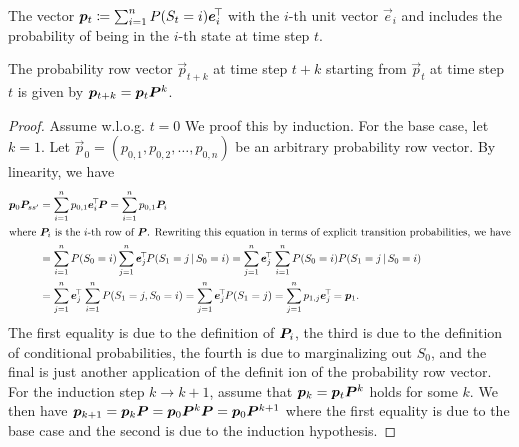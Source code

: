 		\begin{definition}  \label{def:probRowVector}
			The vector \( \bm{p}_t \coloneqq \sum_{i = 1}^{n} P(S_t = i) \bm{e}_i^{\!\top\!} \) with the \(i\)-th unit vector \(\vec{e}_i\) and includes the probability of being in the \(i\)-th state at time step \(t\).
		\end{definition}

		\begin{theorem}
			The probability row vector \( \vec{p}_{t + k} \) at time step \(t + k\) starting from \(\vec{p}_t\) at time step \(t\) is given by \( \bm{p}_{t + k} = \bm{p}_t \bm{P}^k \).
		\end{theorem}
		\begin{proof}
			Assume w.l.o.g. \( t = 0 \) We proof this by induction. For the base case, let \(k = 1\). Let \( \vec{p}_0 = (p_{0, 1}, p_{0, 2}, \dots, p_{0, n}) \) be an arbitrary probability row vector. By linearity, we have
			\begin{align}
				\vec{p}_0 \mat{P}_{ss'}
				 & = \sum_{i = 1}^{n} p_{0, 1} \vec{e}_i^\transposed \mat{P}
				= \sum_{i = 1}^{n} p_{0, 1} \mat{P}_i                                                             \\
				\intertext{where \(\mat{P}_i\) is the \(i\)-th row of \(\mat{P}\). Rewriting this equation in terms of explicit transition probabilities, we have}
				 & = \sum_{i = 1}^{n} P(S_0 = i) \sum_{j = 1}^{n} \vec{e}_j^\transposed P(S_1 = j \given S_0 = i)
				= \sum_{j = 1}^{n} \vec{e}_j^\transposed \,\sum_{i = 1}^{n} P(S_0 = i) P(S_1 = j \given S_0 = i)  \\
				 & = \sum_{j = 1}^{n} \vec{e}_j^\transposed \,\sum_{i = 1}^{n} P(S_1 = j, S_0 = i)
				= \sum_{j = 1}^{n} \vec{e}_j^\transposed P(S_1 = j)
				= \sum_{j = 1}^{n} p_{1, j} \vec{e}_j^\transposed
				= \vec{p}_1.
			\end{align}
			The first equality is due to the definition of \(\bm{P}_i\), the third is due to the definition of conditional probabilities, the fourth is due to marginalizing out \(S_0\), and the final is just another application of the definit ion of the probability row vector. For the induction step \( k \to k + 1 \), assume that \( \bm{p}_k = \bm{p}_t \bm{P}^k \) holds for some \(k\). We then have \( \bm{p}_{k + 1} = \bm{p}_k \bm{P} = \bm{p}_0 \bm{P}^k \bm{P} = \bm{p}_0 \bm{P}^{k + 1} \) where the first equality is due to the base case and the second is due to the induction hypothesis.
		\end{proof}

